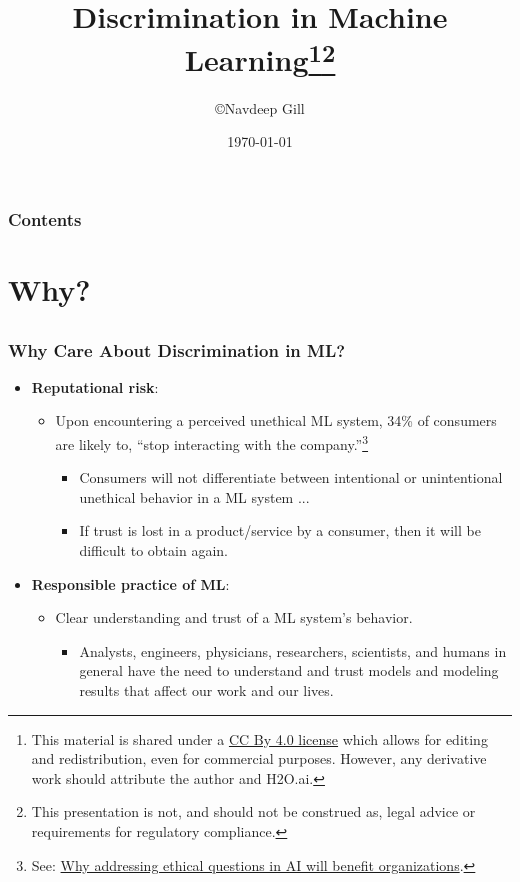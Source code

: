 \documentclass[11pt,
               		aspectratio=169,
               		hyperref={colorlinks}
               		]{beamer}
\author{\copyright\hspace{1pt}Navdeep Gill}
\title{Discrimination in Machine Learning\footnote{\tiny{This material is shared under a \href{https://creativecommons.org/licenses/by/4.0/deed.ast}{CC By 4.0 license} which allows for editing and redistribution, even for commercial purposes. However, any derivative work should attribute the author and H2O.ai.}}\footnote{\tiny{This presentation is not, and should not be construed as, legal advice or requirements for regulatory compliance.}}}
\subtitle{\scriptsize{}}
\institute{\href{https://www.h2o.ai}{H\textsubscript{2}O.ai}}
\date{\today}
\begin{document}
	\maketitle
	\begin{frame}
		\frametitle{Contents}
		\tableofcontents{}
	\end{frame}
	\section{Why?}
		\subsection*{}
		\begin{frame}				
			\frametitle{Why Care About Discrimination in ML?}
			\begin{itemize}
				\Large
				\item \textbf{Reputational risk}: 
  			  \begin{itemize}
  			    \item {Upon encountering a perceived unethical ML system, 34\% of consumers are likely to, ``stop interacting with the company.''\footnote{\scriptsize{See: \href{https://www      .capgemini.com/research/why-addressing-ethical-questions-in-ai-will-benefit-organizations/}{Why addressing ethical questions in AI will benefit organizations}.}}}
  			      \begin{itemize}
  			        \item \tiny{Consumers will not differentiate between intentional or unintentional unethical behavior in a ML system ...}
  			        \item \tiny{If trust is lost in a product/service by a consumer, then it will be difficult to obtain again.}
  			      \end{itemize}
  			  \end{itemize}
				\item \textbf{Responsible practice of ML}:
  				\begin{itemize}
  				  \item {Clear understanding and trust of a ML system's behavior.}
  				    \begin{itemize}
      				  \item \tiny{Analysts, engineers, physicians, researchers, scientists, and humans in general have the need to understand and trust models and modeling results that affect our work and our lives.}

\end{itemize}
\end{itemize}
\end{itemize}
\end{frame}
\end{document}
